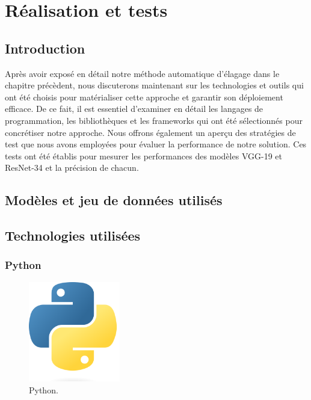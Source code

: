 

\chapter{Réalisation et tests}
\section{Introduction}
Après avoir exposé en détail notre méthode automatique d'élagage dans le chapitre précèdent, nous discuterons maintenant sur les technologies et outils qui ont été choisis pour matérialiser cette approche et garantir son déploiement efficace. De ce fait, il est essentiel d'examiner en détail les langages de programmation, les bibliothèques et les frameworks qui ont été sélectionnés pour concrétiser notre approche. Nous offrons également un aperçu des stratégies de test que nous avons employées pour évaluer la performance de notre solution. Ces tests ont été établis pour mesurer les performances des modèles VGG-19 et ResNet-34 et la précision de chacun.

\section{Modèles et jeu de données utilisés}



\section{Technologies utilisées}
\subsection{Python}

\begin{figure}[hbt!]
  \centering
  \includegraphics[width=4cm]{images_pfe/python.png}
  \caption{Python.}
  \label{fig:python}
\end{figure}
\FloatBarrier
\medskip


